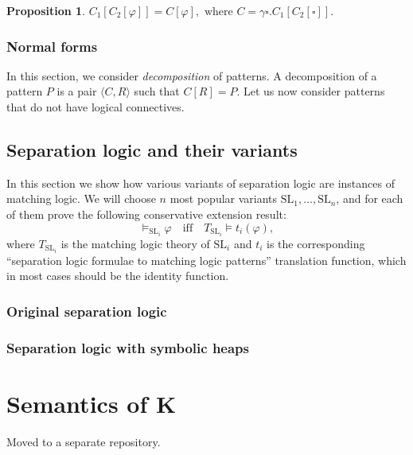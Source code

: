 \documentclass{article}
\theoremstyle{plain}
\newtheorem{prop}[thm]{Proposition}
\begin{document}
\begin{prop}
	$C_1[C_2[\varphi]] = C [\varphi], \text{ where } C = \gamma \square . C_1[C_2[\square]].$
\end{prop}

\subsubsection{Normal forms}

In this section, we consider \emph{decomposition} of patterns. A decomposition of a pattern $P$ is a pair $\langle C, R \rangle $ such that $C[R] = P$. Let us now consider patterns that do not have logical connectives.

\subsection{Separation logic and their variants}

In this section we show how various variants of separation logic are instances of matching logic. We will choose $n$ most popular variants $\mathrm{SL}_1, \dots, \mathrm{SL}_n$, and for each of them prove the following conservative extension result:
\begin{equation*}
\vDash_{\mathrm{SL}_i} \varphi \quad \text{iff} \quad T_{\mathrm{SL}_i} \vDash t_i(\varphi),
\end{equation*}
where $T_{\mathrm{SL}_i}$ is the matching logic theory of $\mathrm{SL}_i$ and $t_i$ is the corresponding ``separation logic formulae to matching logic patterns''  translation function, which in most cases should be the identity function.

\subsubsection{Original separation logic}

\subsubsection{Separation logic with symbolic heaps}

\section{Semantics of K}

Moved to a separate repository.
\end{document}
